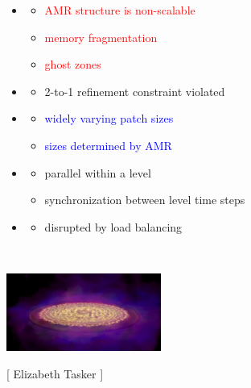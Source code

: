 \begin{frame}[fragile,label=ss-approach]
\begin{minipage}{3.0in}
\begin{itemize}
\item {}
\begin{itemize}
  \item<2-> \textcolor{red}{AMR structure is non-scalable}
  \item<2-> \textcolor{red}{memory fragmentation}
  \item<2-> \textcolor{red}{ghost zones}
\end{itemize}
\item {}
\begin{itemize}
   \item<3-> \textcolor{green!80!black}{2-to-1 refinement constraint violated}
\end{itemize}
\item {}
\begin{itemize}
   \item<4-> \textcolor{blue}{widely varying patch sizes}
   \item<4-> \textcolor{blue}{sizes determined by AMR}
\end{itemize}
\item {}
\begin{itemize}
   \item<5-> \textcolor{cyan!80!black}{parallel within a level}
   \item<5-> \textcolor{cyan!80!black}{synchronization between level time steps}
\end{itemize}
\item {}
\begin{itemize}
   \item<6-> \textcolor{orange!80!black}{disrupted by load balancing}
\end{itemize}
\end{itemize}
\end{minipage} \
\begin{minipage}{1.0in}
\centerline{\includegraphics[width=2.0in,angle=90]{iso_and_volume_02_sm.jpg}}
\centerline{\tiny{[ Elizabeth Tasker ]}}
\end{minipage}
\end{frame}

